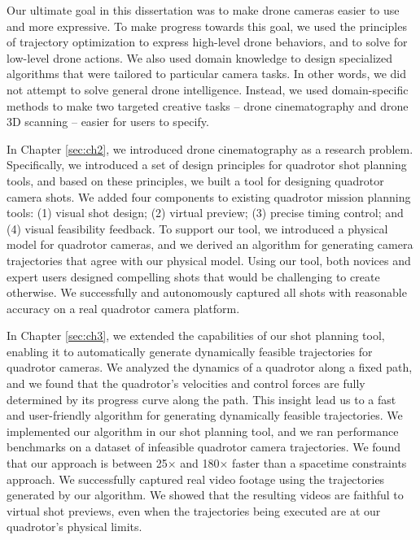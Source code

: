 \label{sec:ch5}

Our ultimate goal in this dissertation was to make drone cameras easier to use and more expressive.
To make progress towards this goal, we used the principles of trajectory optimization to express high-level drone behaviors, and to solve for low-level drone actions.
We also used domain knowledge to design specialized algorithms that were tailored to particular camera tasks.
In other words, we did not attempt to solve general drone intelligence.
Instead, we used domain-specific methods to make two targeted creative tasks -- drone cinematography and drone 3D scanning -- easier for users to specify.

In Chapter \ref{sec:ch2}, we introduced drone cinematography as a research problem.
Specifically, we introduced a set of design principles for quadrotor shot planning tools, and based on these principles, we built a tool for designing quadrotor camera shots.
We added four components to existing quadrotor mission planning tools: (1) visual shot design; (2) virtual preview; (3) precise timing control; and (4) visual feasibility feedback. 
To support our tool, we introduced a physical model for quadrotor cameras, and we derived an algorithm for generating camera trajectories that agree with our physical model.
Using our tool, both novices and expert users designed compelling shots that would be challenging to create otherwise.
We successfully and autonomously captured all shots with reasonable accuracy on a real quadrotor camera platform.

In Chapter \ref{sec:ch3}, we extended the capabilities of our shot planning tool, enabling it to automatically generate dynamically feasible trajectories for quadrotor cameras.
We analyzed the dynamics of a quadrotor along a fixed path, and we found that the quadrotor's velocities and control forces are fully determined by its progress curve along the path.
This insight lead us to a fast and user-friendly algorithm for generating dynamically feasible trajectories.
We implemented our algorithm in our shot planning tool, and we ran performance benchmarks on a dataset of infeasible quadrotor camera trajectories.
We found that our approach is between 25$\times$ and 180$\times$ faster than a spacetime constraints approach.
We successfully captured real video footage using the trajectories generated by our algorithm.
We showed that the resulting videos are faithful to virtual shot previews, even when the trajectories being executed are at our quadrotor's physical limits.


